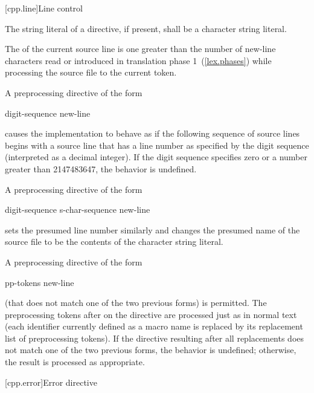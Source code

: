 [cpp.line]{Line control}%
%

\pnum
The string literal of a
directive, if present,
shall be a character string literal.

\pnum
The
of the current source line is one greater than
the number of new-line characters read or introduced
in translation phase 1~(\ref{lex.phases})
while processing the source file to the current token.

\pnum
A preprocessing directive of the form

\begin{ncsimplebnf}
 digit-sequence new-line
\end{ncsimplebnf}

causes the implementation to behave as if
the following sequence of source lines begins with a
source line that has a line number as specified
by the digit sequence (interpreted as a decimal integer).
If the digit sequence specifies zero
or a number greater than 2147483647,
the behavior is undefined.

\pnum
A preprocessing directive of the form

\begin{ncsimplebnf}
 digit-sequence  s-char-sequence\opt{}  new-line
\end{ncsimplebnf}

sets the presumed line number similarly and changes the
presumed name of the source file to be the contents
of the character string literal.

\pnum
A preprocessing directive of the form

\begin{ncsimplebnf}
 pp-tokens new-line
\end{ncsimplebnf}

(that does not match one of the two previous forms)
is permitted.
The preprocessing tokens after
on the directive are processed just as in normal text
(each identifier currently defined as a macro name is replaced by its
replacement list of preprocessing tokens).
If the directive resulting after all replacements does not match
one of the two previous forms, the behavior is undefined;
otherwise, the result is processed as appropriate.

[cpp.error]{Error directive}%
%

